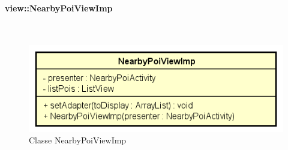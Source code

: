 \documentclass[../DefinizioneDiProdotto.tex]{subfiles}
\begin{document}
\paragraph{view::NearbyPoiViewImp}
\
\begin{figure}[H]
	\centering
	\includegraphics[width=\maxwidth]{img/NearbyPoiViewImp.png}
	\caption{Classe NearbyPoiViewImp}\label{fig:view::NearbyPoiViewImp} 
\end{figure}
\end{document}
